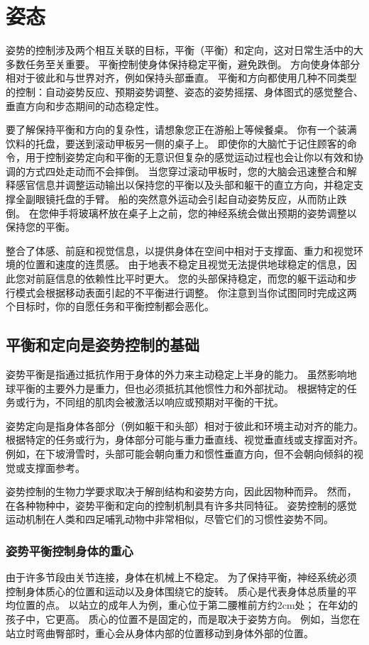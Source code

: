 \chapter{姿态}
姿势的控制涉及两个相互关联的目标，平衡（平衡）和定向，这对日常生活中的大多数任务至关重要。 平衡控制使身体保持稳定平衡，避免跌倒。 方向使身体部分相对于彼此和与世界对齐，例如保持头部垂直。 平衡和方向都使用几种不同类型的控制：自动姿势反应、预期姿势调整、姿态的姿势摇摆、身体图式的感觉整合、垂直方向和步态期间的动态稳定性。

要了解保持平衡和方向的复杂性，请想象您正在游船上等候餐桌。 你有一个装满饮料的托盘，要送到滚动甲板另一侧的桌子上。 即使你的大脑忙于记住顾客的命令，用于控制姿势定向和平衡的无意识但复杂的感觉运动过程也会让你以有效和协调的方式四处走动而不会摔倒。 当您穿过滚动甲板时，您的大脑会迅速整合和解释感官信息并调整运动输出以保持您的平衡以及头部和躯干的直立方向，并稳定支撑全副眼镜托盘的手臂。 船的突然意外运动会引起自动姿势反应，从而防止跌倒。 在您伸手将玻璃杯放在桌子上之前，您的神经系统会做出预期的姿势调整以保持您的平衡。

整合了体感、前庭和视觉信息，以提供身体在空间中相对于支撑面、重力和视觉环境的位置和速度的连贯感。 由于地表不稳定且视觉无法提供地球稳定的信息，因此您对前庭信息的依赖性比平时更大。 您的头部保持稳定，而您的躯干运动和步行模式会根据移动表面引起的不平衡进行调整。 你注意到当你试图同时完成这两个目标时，你的自愿任务和平衡控制都会恶化。

\section{平衡和定向是姿势控制的基础}
姿势平衡是指通过抵抗作用于身体的外力来主动稳定上半身的能力。 虽然影响地球平衡的主要外力是重力，但也必须抵抗其他惯性力和外部扰动。 根据特定的任务或行为，不同组的肌肉会被激活以响应或预期对平衡的干扰。

姿势定向是指身体各部分（例如躯干和头部）相对于彼此和环境主动对齐的能力。 根据特定的任务或行为，身体部分可能与重力垂直线、视觉垂直线或支撑面对齐。 例如，在下坡滑雪时，头部可能会朝向重力和惯性垂直方向，但不会朝向倾斜的视觉或支撑面参考。

姿势控制的生物力学要求取决于解剖结构和姿势方向，因此因物种而异。 然而，在各种物种中，姿势平衡和定向的控制机制具有许多共同特征。 姿势控制的感觉运动机制在人类和四足哺乳动物中非常相似，尽管它们的习惯性姿势不同。


\subsection{姿势平衡控制身体的重心}
由于许多节段由关节连接，身体在机械上不稳定。 为了保持平衡，神经系统必须控制身体质心的位置和运动以及身体围绕它的旋转。 质心是代表身体总质量的平均位置的点。 以站立的成年人为例，重心位于第二腰椎前方约2cm处； 在年幼的孩子中，它更高。 质心的位置不是固定的，而是取决于姿势方向。 例如，当您在站立时弯曲臀部时，重心会从身体内部的位置移动到身体外部的位置。

